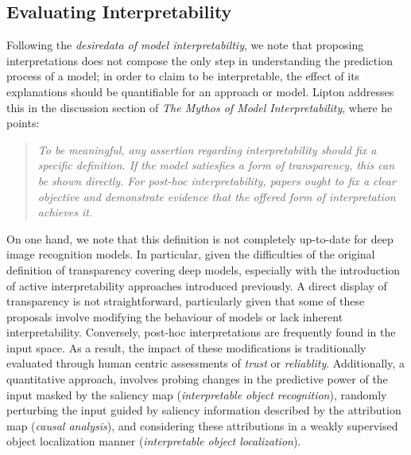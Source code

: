 \subsection{Evaluating Interpretability}
\label{rel:sub_evl}
Following the \emph{desiredata of model interpretabiltiy}, we note that proposing interpretations 
does not compose the only step in understanding the prediction process of a model; in order to 
claim to be interpretable, the effect of its explanations should be quantifiable for an approach 
or model. Lipton addresses this in the discussion section of \emph{The Mythos of Model 
Interpretability}, where he points: 
\begin{quote}
	\emph{To be meaningful, any assertion regarding interpretability should fix a specific 
	definition. If the model satiesfies a form of transparency, this can be shown directly. 
	For post-hoc interpretability, papers ought to fix a clear objective and demonstrate evidence 
	that the offered form of interpretation achieves it.}
\end{quote}
On one hand, we note that this definition is not completely up-to-date for deep image recognition 
models. In particular, given the difficulties of the original definition of transparency covering 
deep models, especially with the introduction of active interpretability approaches introduced 
previously. A direct display of transparency is not straightforward, particularly given that some 
of these proposals involve modifying the behaviour of models or lack inherent interpretability. 
Conversely, post-hoc interpretations are frequently found in the input space. As a result, 
the impact of these modifications is traditionally evaluated through human centric assessments of 
\emph{trust} or \emph{reliablity}. Additionally, a quantitative approach, involves probing changes 
in the predictive power of the input masked by the saliency map (\emph{interpretable object 
recognition}), randomly perturbing the input guided by saliency information described by the 
attribution map (\emph{causal analysis}), and considering these attributions in a weakly supervised 
object localization manner (\emph{interpretable object localization}).

